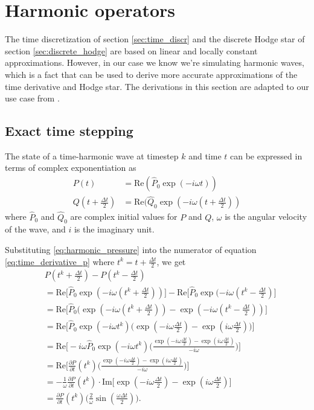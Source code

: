 \documentclass[utf8,english]{gradu3}
\begin{document}
\section{Harmonic operators}\label{sec:harmonic_operators}

The time discretization of section \ref{sec:time_discr}
and the discrete Hodge star of section \ref{sec:discrete_hodge}
are based on linear and locally constant approximations.
However, in our case we know we're simulating harmonic waves,
which is a fact that can be used to derive more accurate approximations
of the time derivative and Hodge star.
The derivations in this section are adapted to our use case
from \parencite{rabina_numerical_2014}.


\subsection{Exact time stepping}\label{sec:exact_timestep}

The state of a time-harmonic wave at timestep $k$ and time $t$
can be expressed in terms of complex exponentiation as
\begin{align}
\label{eq:harmonic_pressure}
P(t) &= \text{Re}(\hat{P}_0 \exp(-i\omega t)) \\
\label{eq:harmonic_flux}
Q(t + \frac{\Delta t}{2}) &= \text{Re}(\hat{Q}_0 \exp(-i\omega (t + \frac{\Delta t}{2}))
\end{align}
where $\hat{P}_0$ and $\hat{Q}_0$ are complex initial values for $P$ and $Q$,
$\omega$ is the angular velocity of the wave, and $i$ is the imaginary unit.

Substituting \eqref{eq:harmonic_pressure}
into the numerator of equation \eqref{eq:time_derivative_p}
where $t^k = t + \frac{\Delta t}{2}$, we get
\begin{align*}
& P(t^k + \frac{\Delta t}{2}) - P(t^k - \frac{\Delta t}{2}) \\
&= \text{Re} \Big[ \hat{P}_0 \exp(-i\omega (t^k + \frac{\Delta t}{2})) \Big]
- \text{Re} \Big[ \hat{P}_0 \exp(-i\omega (t^k - \frac{\Delta t}{2}) \Big] \\
&= \text{Re} \Big[ \hat{P}_0 (\exp(-i\omega (t^k + \frac{\Delta t}{2}))
- \exp(-i\omega (t^k - \frac{\Delta t}{2})) \Big] \\
&= \text{Re} \Big[ \hat{P}_0 \exp(-i\omega t^k)
\Big( \exp(-i\omega \frac{\Delta t}{2}) - \exp(i\omega \frac{\Delta t}{2}) \Big) \Big] \\
&= \text{Re} \Big[ -i\omega \hat{P}_0 \exp(-i\omega t^k)
\Big(\frac{\exp(-i\omega \frac{\Delta t}{2}) - \exp(i\omega \frac{\Delta t}{2})}{-i\omega}\Big) \Big] \\
&= \text{Re} \Big[ \frac{\partial P}{\partial t}(t^k)
\Big(\frac{\exp(-i\omega \frac{\Delta t}{2}) - \exp(i\omega \frac{\Delta t}{2})}{-i\omega}\Big) \Big] \\
&= - \frac{1}{\omega} \frac{\partial P}{\partial t}(t^k)
\cdot \text{Im} \Big[\exp(-i\omega \frac{\Delta t}{2}) - \exp(i\omega \frac{\Delta t}{2}) \Big] \\
&= \frac{\partial P}{\partial t}(t^k) \Big(\frac{2}{\omega} \sin(\frac{\omega \Delta t}{2}) \Big).
\end{align*}
\end{document}
